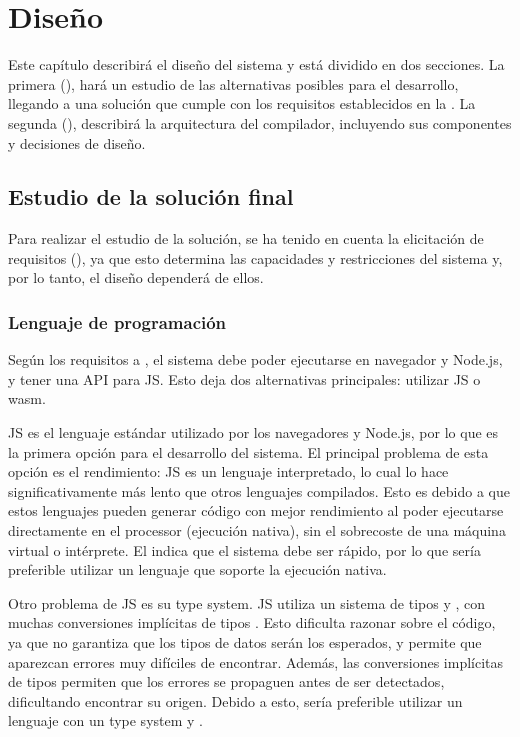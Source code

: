 \chapter{Diseño}\label{chap:design}

Este capítulo describirá el diseño del sistema y está dividido en dos
secciones. La primera (), hará un estudio de las
alternativas posibles para el desarrollo, llegando a una solución que cumple con
los requisitos establecidos en la . La segunda
(), describirá la arquitectura del compilador,
incluyendo sus componentes y decisiones de diseño.

\section{Estudio de la solución final}\label{sec:solution_study}

Para realizar el estudio de la solución, se ha tenido en cuenta la elicitación
de requisitos (), ya que esto determina las capacidades
y restricciones del sistema y, por lo tanto, el diseño dependerá de ellos.

\subsection{Lenguaje de programación}\label{subsec:language}

Según los requisitos  a , el sistema
debe poder ejecutarse en navegador y Node.js, y tener una \gls{API} para
\gls{JS}. Esto deja dos alternativas principales: utilizar \gls{JS} o
\gls{wasm}.

\gls{JS} es el lenguaje estándar utilizado por los navegadores y Node.js, por lo
que es la primera opción para el desarrollo del sistema. El principal problema
de esta opción es el rendimiento: \gls{JS} es un lenguaje interpretado, lo cual
lo hace significativamente más lento que otros lenguajes compilados. Esto es
debido a que estos lenguajes pueden generar código con mejor rendimiento al
poder ejecutarse directamente en el \gls{processor} (ejecución nativa), sin el
sobrecoste de una máquina virtual o intérprete. El 
indica que el sistema debe ser rápido, por lo que sería preferible utilizar un
lenguaje que soporte la ejecución nativa.

Otro problema de \gls{JS} es su \gls{type system}. \gls{JS} utiliza un sistema de
tipos  y ,
con muchas conversiones implícitas de tipos \parencite{js-type-system}. Esto
dificulta razonar sobre el código, ya que no garantiza que los tipos de datos
serán los esperados, y permite que aparezcan errores muy difíciles de encontrar.
Además, las conversiones implícitas de tipos permiten que los errores se
propaguen antes de ser detectados, dificultando encontrar su origen. Debido a
esto, sería preferible utilizar un lenguaje con un \gls{type system}
 y .

